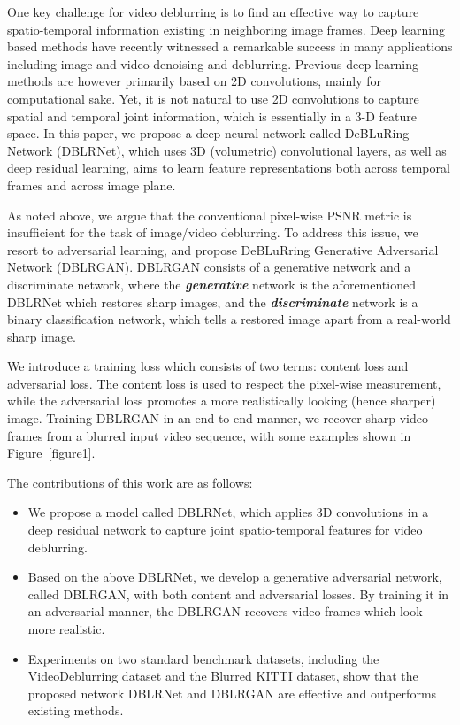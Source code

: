 \documentclass[journal]{IEEEtran}
\begin{document}
One key challenge for video deblurring is to find an effective way to capture spatio-temporal information existing in neighboring image frames. Deep learning based methods have recently witnessed a remarkable success in many applications including image and video denoising and deblurring. Previous deep learning methods are however primarily based on 2D convolutions, mainly for computational sake. Yet, it is not natural to use 2D convolutions to capture spatial and temporal joint information, which is essentially in a 3-D feature space. In this paper, we propose a deep neural network called DeBLuRing Network (DBLRNet), which uses 3D (volumetric) convolutional layers, as well as deep residual learning, aims to learn feature representations both across temporal frames and across image plane.  

As noted above, we argue that the conventional pixel-wise PSNR metric is insufficient for the task of image/video deblurring. To address this issue, we resort to adversarial learning, and propose DeBLuRring Generative Adversarial Network (DBLRGAN). DBLRGAN consists of a generative network and a discriminate network, where the \textit{\textbf{generative}} network is the aforementioned DBLRNet which restores sharp images, and the \textit{\textbf{discriminate}} network is a binary classification network, which tells a restored image apart from a real-world sharp image.


We introduce a training loss which consists of two terms: content loss and adversarial loss. The content loss is used to respect the pixel-wise measurement, while the adversarial loss promotes a more realistically looking (hence sharper) image.  Training DBLRGAN in an end-to-end manner, we recover sharp video frames from a blurred input video sequence, with some examples shown in Figure~\ref{figure1}.  

The contributions of this work are as follows:
\begin{itemize}
\item 
We propose a model called DBLRNet, which applies  3D convolutions in a deep residual network to capture joint spatio-temporal features for video deblurring.
\item 
Based on the above DBLRNet, we develop a generative adversarial network, called DBLRGAN, with both content and adversarial losses. By training it in an adversarial manner, the DBLRGAN recovers video frames which look more realistic.
\item Experiments on two standard benchmark datasets, including the VideoDeblurring dataset and the Blurred KITTI dataset, show that the proposed network DBLRNet and DBLRGAN are effective and outperforms existing methods.
\end{itemize}
\end{document}
